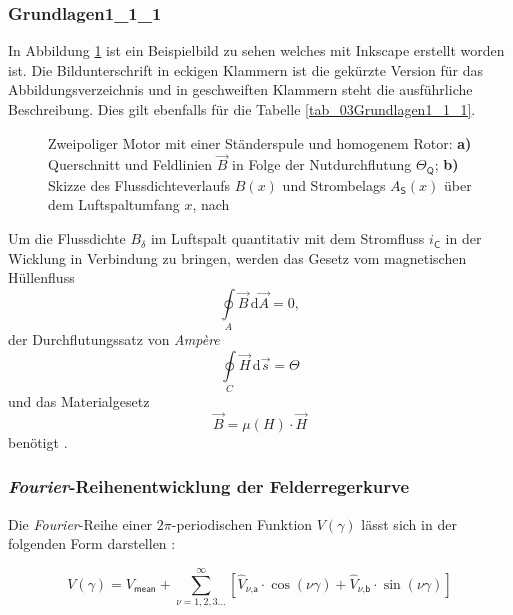 \subsubsection{Grundlagen1\_1\_1}
\label{ch_03Grundlagen1_1_1}
In Abbildung \ref{fig_03Grundlagen1_1_1_1} ist ein Beispielbild zu sehen welches mit Inkscape erstellt worden ist. Die Bildunterschrift in eckigen Klammern ist die gekürzte Version für das Abbildungsverzeichnis und in geschweiften Klammern steht die ausführliche Beschreibung. Dies gilt ebenfalls für die Tabelle \ref{tab_03Grundlagen1_1_1}. 

\begin{figure}[h]
\centering
\def\svgwidth{400pt}

\caption[Zweipoliger Motor mit einer Ständerspule und homogenem Rotor]{Zweipoliger Motor mit einer Ständerspule und homogenem Rotor: \textbf{a)} Querschnitt und Feldlinien $\vec{B}$ in Folge der Nutdurchflutung $\Theta_\textsf{Q}$; \textbf{b)} Skizze des Flussdichteverlaufs $B(x)$ und Strombelags $A_\textsf{S}(x)$ über dem Luftspaltumfang $x$, nach \cite{Binder.2017}}
\label{fig_03Grundlagen1_1_1_1}
\end{figure}

Um die Flussdichte $B_\delta$ im Luftspalt quantitativ mit dem Stromfluss $i_\textsf{C}$ in der Wicklung in Verbindung zu bringen, werden das Gesetz vom magnetischen Hüllenfluss
%
\begin{equation}
\label{equ_03Grundlagen1_1_1_1}
\oint\limits_A \vec{B} \,\text{d}\vec{A} = 0,
\end{equation}
%
der Durchflutungssatz von \textit{Ampère}
%
\begin{equation}
\label{equ_03Grundlagen1_1_1_2}
\oint\limits_C \vec{H} \,\text{d}\vec{s} = \Theta
\end{equation}
%
und das Materialgesetz
%
\begin{equation}
\label{equ_03Grundlagen1_1_1_3}
\vec{B} = \mu(H) \cdot \vec{H}
\end{equation}
%
benötigt \cite{Binder.2017}.

\subsubsection{\textit{Fourier}-Reihenentwicklung der Felderregerkurve}
\label{ch_03Fourier}
Die \textit{Fourier}-Reihe einer $2\pi$-periodischen Funktion $V(\gamma)$ lässt sich in der folgenden Form darstellen \cite{Binder.2017}:

\begin{equation}
\label{equ_03Fourier1}
V(\gamma) = V_\textsf{mean} + \sum\limits_{\nu=1,2,3...}^\infty \left \lbrack \hat{V}_{\nu\textsf{,a}} \cdot \cos(\nu \gamma) + \hat{V}_{\nu\textsf{,b}} \cdot \sin(\nu \gamma) \right \rbrack
\end{equation}

